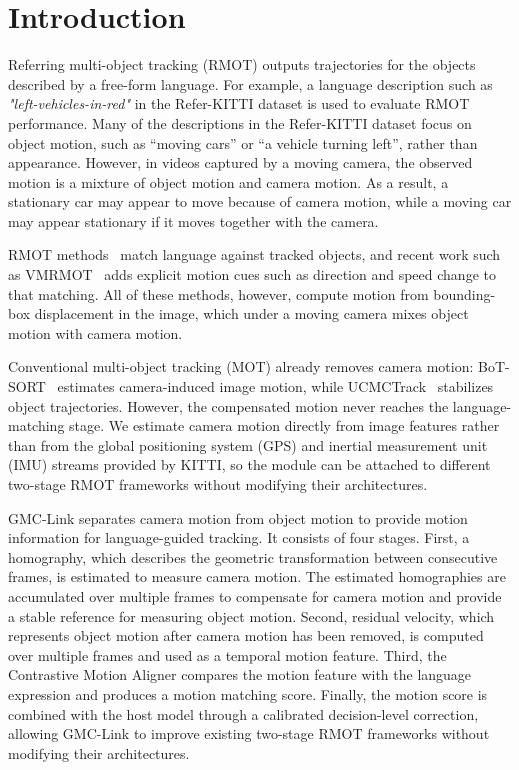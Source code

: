 \documentclass[sigconf,anonymous,nonacm]{acmart}
\begin{document}

\maketitle
\thispagestyle{empty}
\pagestyle{empty}

\section{Introduction}
\label{sec:intro}

Referring multi-object tracking (RMOT) outputs trajectories for the objects described by a free-form language. For example, a language description such as \emph{"left-vehicles-in-red"} in the Refer-KITTI dataset is used to evaluate RMOT performance. Many of the descriptions in the Refer-KITTI dataset focus on object motion, such as ``moving cars'' or ``a vehicle turning left'', rather than appearance. However, in videos captured by a moving camera, the observed motion is a mixture of object motion and camera motion. As a result, a stationary car may appear to move because of camera motion, while a moving car may appear stationary if it moves together with the camera.

RMOT methods~\cite{transrmot,ikun,flexhook} match language against tracked objects, and recent work such as VMRMOT~\cite{vmrmot} adds explicit motion cues such as direction and speed change to that matching. All of these methods, however, compute motion from bounding-box displacement in the image, which under a moving camera mixes object motion with camera motion.

Conventional multi-object tracking (MOT) already removes camera motion: BoT-SORT~\cite{botsort} estimates camera-induced image motion, while UCMCTrack~\cite{ucmctrack} stabilizes object trajectories. However, the compensated motion never reaches the language-matching stage. We estimate camera motion directly from image features rather than from the global positioning system (GPS) and inertial measurement unit (IMU) streams provided by KITTI, so the module can be attached to different two-stage RMOT frameworks without modifying their architectures.

GMC-Link separates camera motion from object motion to provide motion information for language-guided tracking. It consists of four stages. First, a homography, which describes the geometric transformation between consecutive frames, is estimated to measure camera motion. The estimated homographies are accumulated over multiple frames to compensate for camera motion and provide a stable reference for measuring object motion. Second, residual velocity, which represents object motion after camera motion has been removed, is computed over multiple frames and used as a temporal motion feature. Third, the Contrastive Motion Aligner compares the motion feature with the language expression and produces a motion matching score. Finally, the motion score is combined with the host model through a calibrated decision-level correction, allowing GMC-Link to improve existing two-stage RMOT frameworks without modifying their architectures.
\end{document}
